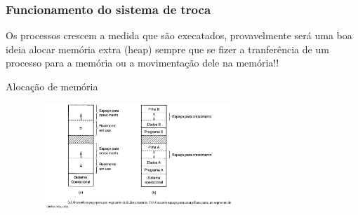 \documentclass[11pt]{beamer}
\begin{document}
\begin{frame}\frametitle{ Funcionamento do sistema de troca}
  Os processos crescem a medida que são execatados, provavelmente será uma boa ideia alocar memória extra (heap) sempre que se fizer 
  a tranferência de um processo para a memória ou a movimentação dele na memória!!
\pause
\begin{exampleblock}{ Alocação de memória}
\pause
  \begin{figure}[h]
    \includegraphics[width=80mm, height=40mm]{Figuras/alocacaoMemoria.png}\\
  \end{figure}

\end{exampleblock}

\end{frame}
\end{document}

